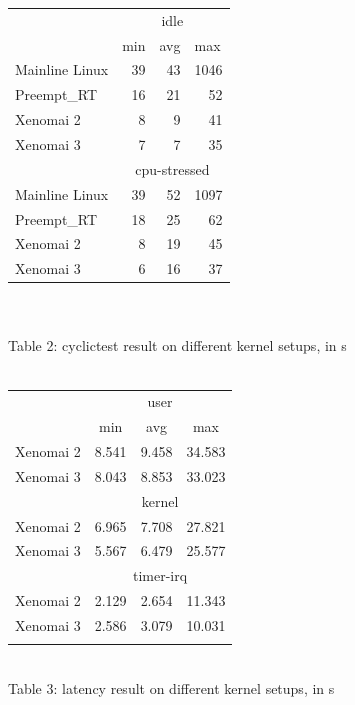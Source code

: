 \documentclass[10pt,a4paper]{article}
\begin{document}
\begin{multicols}{2}
\begin{tabular}{|l|r|r|r|}
\hline
\multirow{2}{*}{} & \multicolumn{3}{c|}{idle}  \\ \cline{2-4} 
 & \multicolumn{1}{l|}{min} & \multicolumn{1}{l|}{avg} & \multicolumn{1}{l|}{max} \\ \hline
Mainline Linux & 39 & 43 & 1046  \\ \hline
Preempt\_RT & 16 & 21 & 52 \\ \hline
Xenomai 2 & 8 & 9 & 41 \\ \hline
Xenomai 3 & 7 & 7 & 35 \\ \hline
 & \multicolumn{3}{c|}{cpu-stressed} \\ \hline
Mainline Linux & 39 & 52 & 1097 \\ \hline
Preempt\_RT & 18 & 25 & 62 \\ \hline
Xenomai 2 & 8 & 19 & 45 \\ \hline
Xenomai 3 & 6 & 16 & 37 \\ \hline
\end{tabular}\\
\vspace{4mm} \\
Table 2: cyclictest result on different kernel setups, in \textmu s\\
\vspace{4mm} \\
\begin{tabular}{|l|c|r|r|}
\hline
\multirow{2}{*}{} & \multicolumn{3}{c|}{user} \\ \cline{2-4} 
 & min & \multicolumn{1}{c|}{avg} & \multicolumn{1}{c|}{max} \\ \hline
Xenomai 2 & 8.541 & 9.458 & 34.583 \\ \hline
Xenomai 3 & 8.043 & 8.853 & 33.023 \\ \hline
& \multicolumn{3}{c|}{kernel}      \\ \hline
Xenomai 2 & 6.965 & 7.708 & 27.821 \\ \hline
Xenomai 3 & 5.567 & 6.479 & 25.577 \\ \hline
& \multicolumn{3}{c|}{timer-irq}   \\ \hline
Xenomai 2 & 2.129 & 2.654 & 11.343 \\ \hline
Xenomai 3 & 2.586 & 3.079 & 10.031 \\ \hline
\vspace{4mm} \\
\end{tabular} \\
Table 3: latency result on different kernel setups, in \textmu s\\


\end{multicols}
\end{document}
